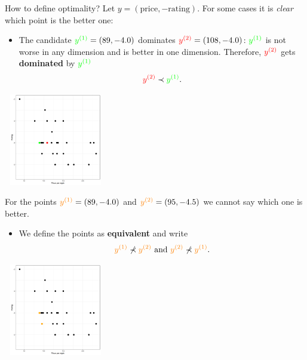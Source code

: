 \documentclass[11pt,compress,t,notes=noshow, xcolor=table]{beamer}
\begin{document}
\begin{vbframe}{How to define optimality?}
Let $y = (\text{price}, - \text{rating})$. For some cases it is \textit{clear} which point is the better one:
\begin{itemize}
    \item The candidate $\textcolor{green}{y^{(1)}} = \left(89, - 4.0\right)$ dominates $\textcolor{red}{y^{(2)}} = \left(108, - 4.0\right)$: $\textcolor{green}{y^{(1)}}$ is not worse in any dimension and is better in one dimension. Therefore, $\textcolor{red}{y^{(2)}}$ gets \textbf{dominated} by $\textcolor{green}{y^{(1)}}$
$$
\textcolor{red}{y^{(2)}} \prec \textcolor{green}{y^{(1)}}.
$$
\end{itemize}

\begin{center}
\includegraphics[width = 4.5cm, height = 4cm ]{figure_man/Example1.png}
\end{center}

\framebreak

For the points $\textcolor{orange}{y^{(1)}} = \left(89, - 4.0\right)$ and $\textcolor{orange}{y^{(2)}} = \left(95, - 4.5\right)$ we cannot say which one is better.

\begin{itemize}
\item We define the points as \textbf{equivalent} and write
$$
\textcolor{orange}{y^{(1)}} \not\prec \textcolor{orange}{y^{(2)}} \text{ and } \textcolor{orange}{y^{(2)}} \not\prec \textcolor{orange}{y^{(1)}}.
$$

\end{itemize}

\begin{center}
\includegraphics[width = 4.5cm, height = 4cm ]{figure_man/Example2.png}
\end{center}


\end{vbframe}
\end{document}
